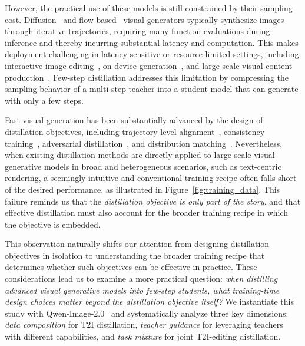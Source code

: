 \documentclass{article}
\begin{document}
However, the practical use of these models is still constrained by their sampling cost. Diffusion~\citep{ho2020denoising, song2020score} and flow-based~\citep{lipman2022flow} visual generators typically synthesize images through iterative trajectories, requiring many function evaluations during inference and thereby incurring substantial latency and computation. This makes deployment challenging in latency-sensitive or resource-limited settings, including interactive image editing~\citep{meng2022sdedit, Brooks2022InstructPix2PixLT}, on-device generation~\citep{li2023snapfusion,zhao2024mobilediffusion}, and large-scale visual content production~\citep{azuma1997survey, yin2025causvid}. Few-step distillation addresses this limitation by compressing the sampling behavior of a multi-step teacher into a student model that can generate with only a few steps.


Fast visual generation has been substantially advanced by the design of distillation objectives, including trajectory-level alignment~\citep{geng2025mean}, consistency training~\citep{song2023consistency}, adversarial distillation~\citep{sauer2024adversarial}, and distribution matching~\citep{yin2024one, yin2024improved, jiang2025distribution}. Nevertheless, when existing distillation methods are directly applied to large-scale visual generative models in broad and heterogeneous scenarios, such as text-centric rendering, a seemingly intuitive and conventional training recipe often falls short of the desired performance, as illustrated in Figure~\ref{fig:training_data}. This failure reminds us that the \textit{distillation objective is only part of the story}, and that effective distillation must also account for the broader training recipe in which the objective is embedded.


This observation naturally shifts our attention from designing distillation objectives in isolation to understanding the broader training recipe that determines whether such objectives can be effective in practice. These considerations lead us to examine a more practical question: \textit{when distilling advanced visual generative models into few-step students, what training-time design choices matter beyond the distillation objective itself?} We instantiate this study with Qwen-Image-2.0~\citep{zhao2026qwen} and systematically analyze three key dimensions: \textit{data composition} for T2I distillation, \textit{teacher guidance} for leveraging teachers with different capabilities, and \textit{task mixture} for joint T2I-editing distillation.
\end{document}
